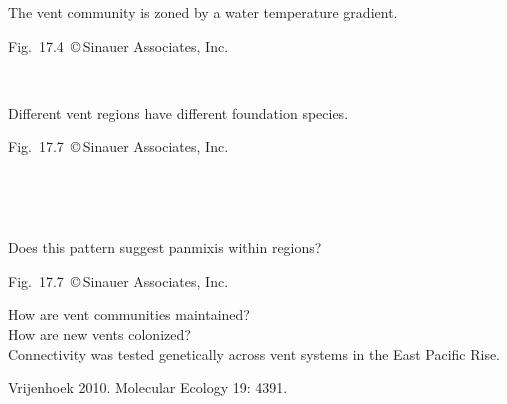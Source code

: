 \documentclass[t]{beamer}
\begin{document}
%
{
\begin{frame}[b]{The vent community is zoned by a water temperature gradient.}

\hfill \tiny Fig.~17.4~\copyright\,Sinauer Associates, Inc.
\end{frame}
}
%
{
\begin{frame}[b]

\hfill \tiny \textcolor{white}{Fig.~17.1~\copyright\,Sinauer Associates, Inc.}
\end{frame}
}
%
{
\begin{frame}[b]{Different vent regions have different foundation species.}

\hfill \tiny Fig.~17.7~\copyright\,Sinauer Associates, Inc.
\end{frame}
}
%
%
%
%

{
\begin{frame}[b]{\textcolor{white}{Vent communities last only a few hundred years.}}

\tiny\textcolor{white}{Ocean Networks Canada, Flickr Creative Commons.}
\end{frame}
}
%

{
\begin{frame}[b]{Does this pattern suggest panmixis within regions?}

\hfill \tiny Fig.~17.7~\copyright\,Sinauer Associates, Inc.
\end{frame}
}
%

{
\begin{frame}[b]

	\vspace*{3\baselineskip}

	\hspace*{65mm}\hangpara\parbox{49mm}{\raggedright \large %
	How are vent communities maintained?\\[\baselineskip]
	How are new vents colonized?\\[\baselineskip]
	Connectivity was tested genetically across vent systems in the East Pacific Rise.}


	\vfilll

	\hfill \tiny Vrijenhoek 2010. Molecular Ecology 19: 4391.
\end{frame}
}
%
\end{document}
